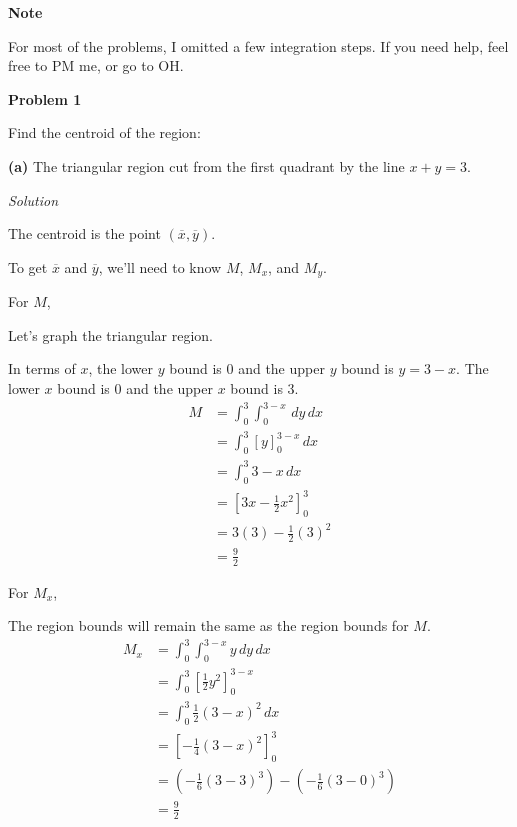 \documentclass{article}
\newcommand{\lrp}[1]{\left( #1 \right)}
\newcommand{\lrb}[1]{\left[ #1 \right]}
\newcommand{\Solution}{\textit{Solution}}
\begin{document}
\textbf{Note}

For most of the problems, I omitted a few integration steps. If you need help, feel free to PM me, or go to OH.

\textbf{Problem 1}

Find the centroid of the region:

\textbf{(a)} The triangular region cut from the first quadrant by the line $x+y=3$.

\Solution

The centroid is the point $\displaystyle \lrp{\overline{x},\overline{y}}$.

To get $\overline{x}$ and $\overline{y}$, we'll need to know $M$, $M_x$, and $M_y$.

For $M$,

Let's graph the triangular region. 
\begin{center}
\end{center} 
In terms of $x$, the lower $y$ bound is $0$ and the upper $y$ bound is $y=3-x$. The lower $x$ bound is $0$ and the upper $x$ bound is $3$.
\begin{align*}
    M&=\int_0^3\int_0^{3-x}\,dy\,dx\\
    &=\int_0^3\lrb{y}_0^{3-x}\,dx\\
    &=\int_0^3 3-x\,dx\\
    &=\lrb{3x-\frac{1}{2}x^2}_0^3\\
    &=3(3)-\frac{1}{2}(3)^2\\
    &=\frac{9}{2}
\end{align*}

For $M_x$,

The region bounds will remain the same as the region bounds for $M$.
\begin{align*}
    M_x&=\int_0^3\int_0^{3-x}y\,dy\,dx\\
    &=\int_0^3 \lrb{\frac{1}{2}y^2}_0^{3-x}\\
    &=\int_0^3 \frac{1}{2}(3-x)^2\,dx\\
    &=\lrb{-\frac{1}{4}(3-x)^2}_0^3\\
    &=\lrp{-\frac{1}{6}(3-3)^3}-\lrp{-\frac{1}{6}(3-0)^3}\\
    &=\frac{9}{2}
\end{align*}
\end{document}
